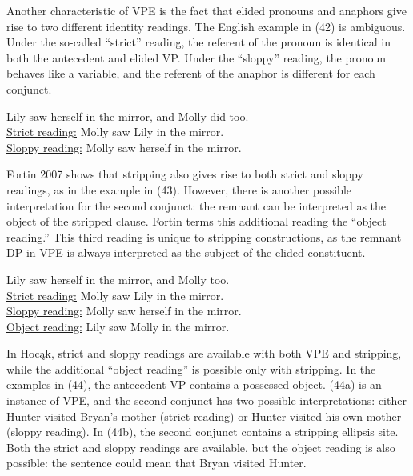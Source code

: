 \documentclass[output=paper]{LSP/langsci}
\begin{document}
Another characteristic of VPE is the fact that elided pronouns and anaphors give rise to two different identity readings. The English example in (42) is ambiguous. Under the so-called ``strict'' reading, the referent of the pronoun is identical in both the antecedent and elided VP. Under the ``sloppy'' reading, the pronoun behaves like a variable, and the referent of the anaphor is different for each conjunct.

\begin{exe}
\ex
Lily saw herself in the mirror, and Molly did too.\\
\underline{Strict reading:} Molly saw Lily in the mirror.\\
\underline{Sloppy reading:} Molly saw herself in the mirror.
\end{exe}

Fortin 2007 shows that stripping also gives rise to both strict and sloppy readings, as in the example in (43). However, there is another possible interpretation for the second conjunct: the remnant can be interpreted as the object of the stripped clause. Fortin terms this additional reading the ``object reading.'' This third reading is unique to stripping constructions, as the remnant DP in VPE is always interpreted as the subject of the elided constituent. 

\begin{exe}
\ex
Lily saw herself in the mirror, and Molly too.\\
\underline{Strict reading:} Molly saw Lily in the mirror.\\
\underline{Sloppy reading:} Molly saw herself in the mirror.\\
\underline{Object reading:} Lily saw Molly in the mirror.
\end{exe}

In Hocąk, strict and sloppy readings are available with both VPE and stripping, while the additional ``object reading'' is possible only with stripping. In the examples in (44), the antecedent VP contains a possessed object. (44a) is an instance of VPE, and the second conjunct has two possible interpretations: either Hunter visited Bryan's mother (strict reading) or Hunter visited his own mother (sloppy reading). In (44b), the second conjunct contains a stripping ellipsis site. Both the strict and sloppy readings are available, but the object reading is also possible: the sentence could mean that Bryan visited Hunter.
\end{document}

